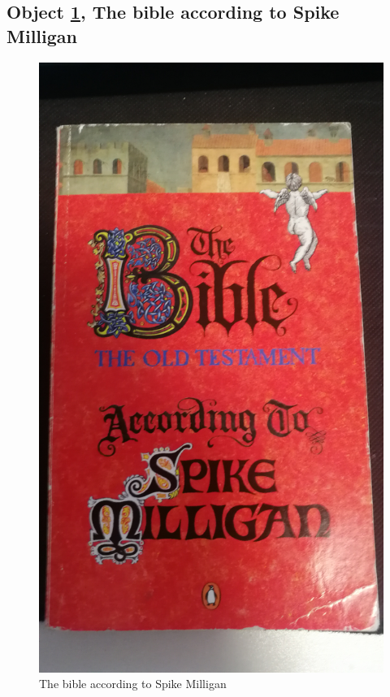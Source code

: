 \documentclass[a4paper,11pt]{article}
\begin{document}
\subsection*{Object \ref{fig:bible}, The bible according to Spike Milligan}

\begin{figure}[h!]
 \centering
 \includegraphics[scale=0.05]{bible.jpg}
 \caption{The bible according to Spike Milligan}
 \label{fig:bible}
\end{figure}
\end{document}
